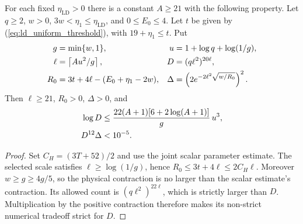\begin{lemma}
    \label{lem:low_energy_scalar_parameters}
    \leanok
    For each fixed $\eta_{\mathrm{LD}}>0$ there is a constant $A\ge21$
    with the following property. Let $q\ge2$, $w>0$,
    $3w<\eta_1\le\eta_{\mathrm{LD}}$, and $0\le E_0\le4$.
    Let $t$ be given by (\ref{eq:ld_uniform_threshold}), with
    $19+\eta_1\le t$. Put
    \begin{align}
        g      & =\min\{w,1\},                              & u & =1+\log q+\log(1/g),\notag \\
        \ell   & =\left\lceil Au^2/g\right\rceil,           &
        D      & =(q\ell^2)^{20\ell},\notag                                                  \\
        R_0    & =3t+4\ell-(E_0+\eta_1-2w),                 &
        \Delta & =\left(2e^{-2\ell^2\sqrt{w/R_0}}\right)^2.
        \label{eq:ld_finite_parameters}
    \end{align}
    Then $\ell\ge21$, $R_0>0$, $\Delta>0$, and
    \begin{align}
        \log D       & \le
        \frac{22(A+1)[6+2\log(A+1)]}{g}\,u^3,\notag \\
        D^{12}\Delta & <10^{-5}.
        \label{eq:ld_strict_tradeoff}
    \end{align}
\end{lemma}
\begin{proof}\leanok
    Set $C_H=(3T+52)/2$ and use the joint scalar parameter estimate.
    The selected scale satisfies $\ell\ge\log(1/g)$, hence
    $R_0\le3t+4\ell\le2C_H\ell$. Moreover $w\ge g\ge4g/5$, so the
    physical contraction is no larger than the scalar estimate's
    contraction. Its allowed count is $(q\ell^2)^{22\ell}$, which is
    strictly larger than $D$. Multiplication by the positive contraction
    therefore makes its non-strict numerical tradeoff strict for $D$.
\end{proof}

